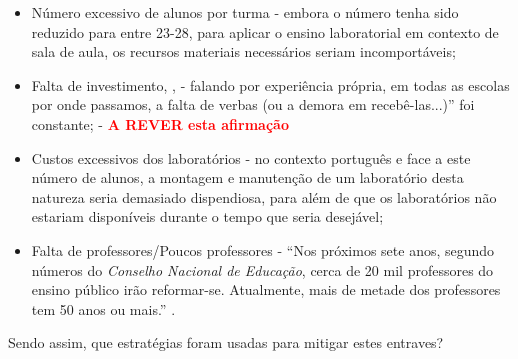 \begin{itemize}
    \item Número excessivo de alunos por turma \cite{Reduçãod55:online} - embora o número tenha sido reduzido para entre 23-28, para aplicar o ensino laboratorial em contexto de sala de aula, os recursos materiais necessários seriam incomportáveis;
    \item Falta de investimento\cite{Faltadei99:online}, \cite{Odesinve56:online}, \cite{EDUSTATP20:online} - falando por experiência própria, em todas as escolas por onde passamos, a falta de verbas (ou a demora em recebê-las...)'' foi constante; - \textcolor{red}{\textbf{A REVER esta afirmação}}
    \item Custos excessivos dos laboratórios - no contexto português e face a este número de alunos, a montagem e manutenção de um laboratório desta natureza seria demasiado dispendiosa, para além de que os laboratórios não estariam disponíveis durante o tempo que seria desejável;
    \item Falta de professores/Poucos professores - ``Nos próximos sete anos, segundo números do \textit{Conselho Nacional de Educação}, cerca de 20 mil professores do ensino público irão reformar-se. Atualmente, mais de metade dos professores tem 50 anos ou mais.'' \cite{Faltaded39:online}.
\end{itemize}

Sendo assim, que estratégias foram usadas para mitigar estes entraves?

